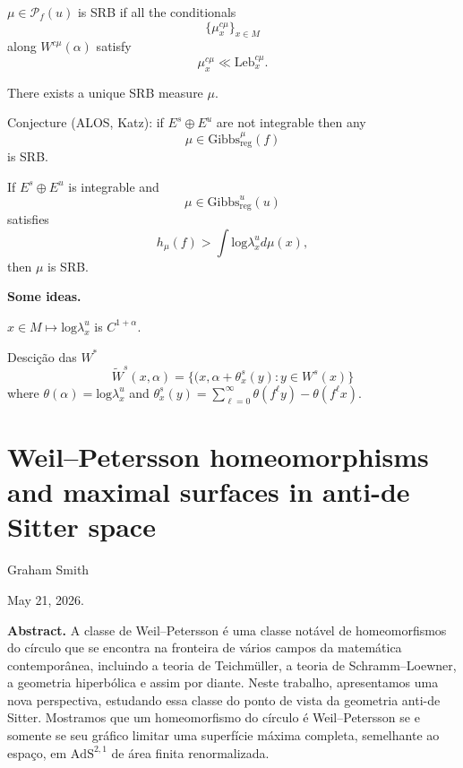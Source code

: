 \begin{definition}
\label{definition-}
$\mu \in \mathcal{P}_f(u)$
is SRB if all the conditionals
$$
\{\mu_x^{c\mu}\}_{x \in M}
$$
along $W^{c\mu}(\alpha)$
satisfy
$$
\mu_x^{c\mu}\ll \text{Leb}_x^{c\mu}.
$$
\end{definition}

\begin{theorem}
\label{theorem-srb}
There exists a unique SRB measure
$\mu$.
\end{theorem}

\noindent
Conjecture (ALOS, Katz): 
if $E^s \oplus E^u$
are not integrable then any
$$
\mu \in \text{Gibbs}_{\text{reg}}^{\mu}(f)
$$
is SRB.

\begin{theorem}[B]
\label{theorem-gibbs-b}
If $E^s \oplus E^u$ is integrable
and
$$
\mu \in \text{Gibbs}_{\text{reg}}^u(u)
$$
satisfies
$$
h_\mu(f)
> \int \text{log}\lambda_x^u d\mu(x),
$$
then $\mu$ is SRB.
\end{theorem}

\medskip\noindent
{\bf Some ideas.}

 \noindent
$x \in M \mapsto \text{log}\lambda_x^u$
is $C^{1+\alpha}$.

Descição das $W^*$
$$
\widetilde{W}^s(x,\alpha)
=\{(x,\alpha+\theta_x^{s}(y)
:y \in W^s(x)\}
$$
where
$\theta(\alpha)=\text{log}\lambda_x^u$
and
$\theta_x^s(y)
=\sum_{\ell=0}^{\infty}
\theta(f^\ell y)
-\theta(f^\ell x)$.

\section{Weil--Petersson homeomorphisms 
and maximal surfaces in anti-de Sitter space}
\label{section-weil-petersson}

\noindent
Graham Smith

May 21, 2026.

\medskip\noindent
{\bf Abstract.}
A classe de Weil--Petersson é uma classe
notável de homeomorfismos do círculo que se
encontra na fronteira de vários campos da
matemática contemporânea, incluindo a teoria
de Teichm\"uller, a teoria de
Schramm--Loewner, a geometria hiperbólica e
assim por diante.
Neste trabalho, apresentamos uma nova
perspectiva, estudando essa classe do ponto
de vista da geometria anti-de Sitter.
Mostramos que um homeomorfismo do círculo é
Weil--Petersson se e somente se seu gráfico
limitar uma superfície máxima completa,
semelhante ao espaço, em
$\mathrm{AdS}^{2,1}$ de área finita
renormalizada.

